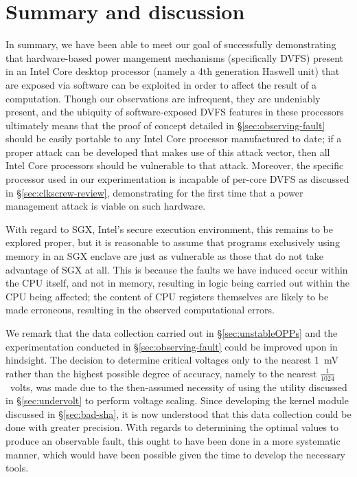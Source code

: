 \section{Summary and discussion}
\label{sec:summary}

In summary, we have been able to meet our goal of successfully demonstrating
that hardware-based power mangement mechanisms (specifically DVFS) present in
an Intel Core desktop processor (namely a 4th generation Haswell unit) that are
exposed via software can be exploited in order to affect the result of a
computation. Though our observations are infrequent, they are undeniably
present, and the ubiquity of software-exposed DVFS features in these processors
ultimately means that the proof of concept detailed in §\ref{sec:observing-fault}
should be easily portable to any Intel Core processor manufactured to date;
if a proper attack can be developed that makes use of this attack vector, then
all Intel Core processors should be vulnerable to that attack. Moreover, the
specific processor used in our experimentation is incapable of per-core DVFS as
discussed in §\ref{sec:clkscrew-review}, demonstrating for the first time that
a power management attack is viable on such hardware.

With regard to SGX, Intel's secure execution environment, this remains to be
explored proper, but it is reasonable to assume that programs exclusively
using memory in an SGX enclave are just as vulnerable as those that do not
take advantage of SGX at all. This is because the faults we have induced occur
within the CPU itself, and not in memory, resulting in logic being carried out
within the CPU being affected; the content of CPU registers themselves are
likely to be made erroneous, resulting in the observed computational errors.

We remark that the data collection carried out in §\ref{sec:unstableOPPs} and
the experimentation conducted in §\ref{sec:observing-fault} could be improved
upon in hindsight. The decision to determine critical voltages only to the
nearest 1~mV rather than the highest possible degree of accuracy, namely to the
nearest $\frac{1}{1024}$~volts, was made due to the then-assumed necessity of
using the  utility discussed in §\ref{sec:undervolt} to perform
voltage scaling. Since developing the kernel module discussed in §\ref{sec:bad-sha},
it is now understood that this data collection could be done with greater
precision. With regards to determining the optimal values to produce an
observable fault, this ought to have been done in a more systematic manner,
which would have been possible given the time to develop the necessary tools.
